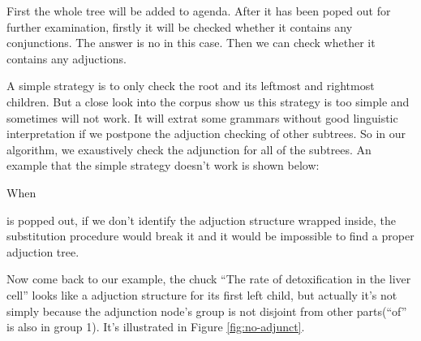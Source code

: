 \documentclass[a4paper]{article}
\begin{document}
First the whole tree will be added to agenda. After it has been poped out for further examination, firstly it will be checked whether it contains any conjunctions. The answer is no in this case. Then we can check whether it contains any adjuctions.

A simple strategy is to only check the root and its leftmost and rightmost children. But a close look into the corpus show us this strategy is too simple and sometimes will not work. It will extrat some grammars without good linguistic interpretation if we postpone the adjuction checking of other subtrees. So in our algorithm, we exaustively check the adjunction for all of the subtrees. An example that the simple strategy doesn't work is shown below:

\begin{center}
\end{center}
When 
\begin{center}
\end{center}
is popped out, if we don't identify the adjuction structure wrapped inside, the substitution procedure would break it and it would be impossible to find a proper adjuction tree.

Now come back to our example, the chuck ``The rate of detoxification in the liver cell'' looks like a adjuction structure for its first left child, but actually it's not simply because the adjunction node's group is not disjoint from other parts(``of'' is also in group 1). It's illustrated in Figure \ref{fig:no-adjunct}.
\end{document}
